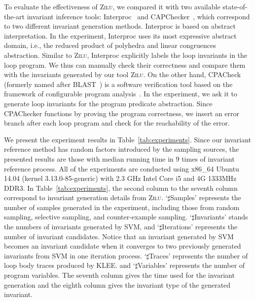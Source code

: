 To evaluate the effectiveness of \textsc{Zilu}, 
we compared it with two available state-of-the-art invariant inference tools: 
Interproc~\cite{cite} and CAPChecker~\cite{cite}, 
which correspond to two different invariant generation methods. 
Interproc is based on abstract interpretation. 
In the experiment, Interproc uses its most expressive abstract domain, i.e., 
the reduced product of polyhedra and linear congruences abstraction. 
Similar to \textsc{Zilu}, Interproc explicitly labels the loop invariants in the loop program. 
We thus can manually check their correctness
and compare them with the invariants generated by our tool \textsc{Zilu}. 
On the other hand, CPACheck (formerly named after BLAST~\cite{cite}) is a software verification tool 
based on the framework of configurable program analysis~\cite{cite}. 
In the experiment, we ask it to generate loop invariants for the program predicate abstraction. 
Since CPAChecker functions by proving the program correctness, 
we insert an error branch after each loop program and check for the reachability of the error. 

We present the experiment results in Table~\ref{tab:experiments}. 
Since our invariant reference method has random factors introduced by the sampling sources, 
the presented results are those with median running time in $9$ times of invariant reference process. 
All of the experiments are conducted using x86\_64 Ubuntu 14.04 (kernel 3.13.0-85-generic) 
with 2.3 GHz Intel Core i5 and 4G 1333MHz DDR3. 
In Table~\ref{tab:experiments}, the second column to the seventh column correspond to 
invariant generation details from \textsc{Zilu}. 
`$\sharp$Samples' represents the number of samples generated in the experiment, 
including those from random sampling, selective sampling, and counter-example sampling. 
`$\sharp$Invariants' stands the numbers of invariants generated by SVM, 
and `$\sharp$Iterations' represents the number of invariant candidates. 
Notice that an invariant generated by SVM becomes an invariant candidate 
when it converges to two previously generated invariants from SVM in one iteration process. 
`$\sharp$Traces' represents the number of loop body traces produced by KLEE. 
and `$\sharp$Variables' represents the number of program variables. 
The seventh column gives the time used for the invariant generation 
and the eighth column gives the invariant type of the generated invariant. 

